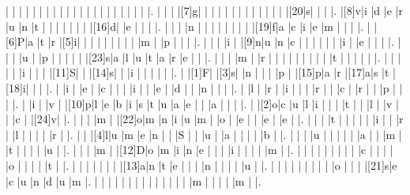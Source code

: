 \documentclass[12pt]{article}
\begin{document}
\begin{Puzzle}{22}{24}
  |{}  |{}  |{}  |{}  |{}  |{}  |{}  |{}  |{}  |{}  |{}  |{}  |{}  |{}  |{}  |{}  |{}  |{}  |{}  |{}  |{}  |.
  |{}  |{}  |{}  |[7]g|{}  |{}  |{}  |{}  |{}  |{}  |{}  |{}  |{}  |{}  |{}  |{}  |{}  |[20]s|{}  |{}  |{}  |.
  |[8]v|i   |d   |e   |r   |u   |n   |t   |{}  |{}  |{}  |{}  |{}  |{}  |{}  |[16]d|{}  |e   |{}  |{}  |{}  |.
  |{}  |{}  |{}  |n   |{}  |{}  |{}  |{}  |{}  |{}  |{}  |{}  |[19]f|a   |c   |i   |e   |m   |{}  |{}  |{}  |.
  |{}  |[6]P|a   |t   |r   |[5]i|{}  |{}  |{}  |{}  |{}  |{}  |{}  |{}  |{}  |m   |{}  |p   |{}  |{}  |{}  |.
  |{}  |{}  |{}  |i   |{}  |[9]n|u   |n   |c   |{}  |{}  |{}  |{}  |{}  |{}  |i   |{}  |e   |{}  |{}  |{}  |.
  |{}  |{}  |{}  |u   |{}  |p   |{}  |{}  |{}  |{}  |{}  |[23]s|a   |l   |u   |t   |a   |r   |e   |{}  |{}  |.
  |{}  |{}  |{}  |m   |{}  |r   |{}  |{}  |{}  |{}  |{}  |{}  |{}  |{}  |{}  |t   |{}  |{}  |{}  |{}  |{}  |.
  |{}  |{}  |{}  |{}  |{}  |i   |{}  |{}  |{}  |[11]S|{}  |{}  |[14]s|{}  |{}  |i   |{}  |{}  |{}  |{}  |{}  |.
  |{}  |[1]F|{}  |[3]s|{}  |n   |{}  |{}  |{}  |p   |{}  |[15]p|a   |r   |[17]a|s   |t   |[18]i|{}  |{}  |{}  |.
  |{}  |i   |{}  |e   |{}  |c   |{}  |{}  |{}  |i   |{}  |{}  |e   |{}  |d   |{}  |{}  |n   |{}  |{}  |{}  |.
  |{}  |l   |{}  |r   |{}  |i   |{}  |{}  |{}  |r   |{}  |{}  |c   |{}  |r   |{}  |{}  |p   |{}  |{}  |{}  |.
  |{}  |i   |{}  |v   |{}  |[10]p|l   |e   |b   |i   |s   |t   |u   |a   |e   |{}  |{}  |a   |{}  |{}  |{}  |.
  |{}  |[2]o|c   |u   |l   |i   |{}  |{}  |{}  |t   |{}  |{}  |l   |{}  |v   |{}  |{}  |c   |{}  |[24]v|{}  |.
  |{}  |{}  |{}  |m   |{}  |[22]o|m   |n   |i   |u   |m   |{}  |o   |{}  |e   |{}  |{}  |e   |{}  |e   |{}  |.
  |{}  |{}  |{}  |t   |{}  |{}  |{}  |{}  |{}  |i   |{}  |{}  |r   |{}  |l   |{}  |{}  |{}  |{}  |r   |{}  |.
  |{}  |{}  |[4]l|u   |m   |e   |n   |{}  |{}  |S   |{}  |{}  |u   |{}  |a   |{}  |{}  |{}  |{}  |b   |{}  |.
  |{}  |{}  |{}  |u   |{}  |{}  |{}  |{}  |{}  |a   |{}  |{}  |m   |{}  |t   |{}  |{}  |{}  |{}  |u   |{}  |.
  |{}  |{}  |{}  |m   |{}  |[12]D|o   |m   |i   |n   |e   |{}  |{}  |{}  |i   |{}  |{}  |{}  |{}  |m   |{}  |.
  |{}  |{}  |{}  |{}  |{}  |{}  |{}  |{}  |{}  |c   |{}  |{}  |{}  |{}  |o   |{}  |{}  |{}  |{}  |t   |{}  |.
  |{}  |{}  |{}  |{}  |{}  |{}  |{}  |[13]a|n   |t   |e   |{}  |{}  |{}  |n   |{}  |{}  |{}  |{}  |u   |{}  |.
  |{}  |{}  |{}  |{}  |{}  |{}  |{}  |{}  |{}  |o   |{}  |{}  |{}  |[21]s|e   |c   |u   |n   |d   |u   |m   |.
  |{}  |{}  |{}  |{}  |{}  |{}  |{}  |{}  |{}  |{}  |{}  |{}  |{}  |{}  |m   |{}  |{}  |{}  |{}  |m   |{}  |.
\end{Puzzle}
\end{document}
